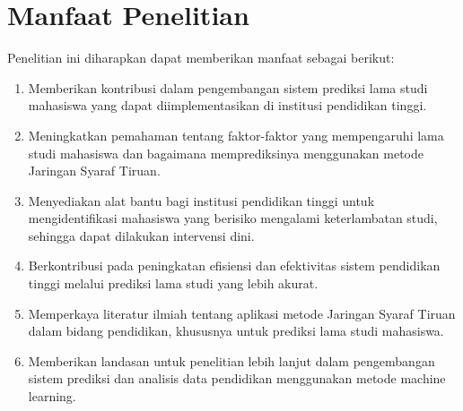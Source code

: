 \section{Manfaat Penelitian}
Penelitian ini diharapkan dapat memberikan manfaat sebagai berikut:

    \begin{enumerate}
        \item Memberikan kontribusi dalam pengembangan sistem prediksi lama studi mahasiswa yang dapat diimplementasikan di institusi pendidikan tinggi.
        \item Meningkatkan pemahaman tentang faktor-faktor yang mempengaruhi lama studi mahasiswa dan bagaimana memprediksinya menggunakan metode Jaringan Syaraf Tiruan.
        \item Menyediakan alat bantu bagi institusi pendidikan tinggi untuk mengidentifikasi mahasiswa yang berisiko mengalami keterlambatan studi, sehingga dapat dilakukan intervensi dini.
        \item Berkontribusi pada peningkatan efisiensi dan efektivitas sistem pendidikan tinggi melalui prediksi lama studi yang lebih akurat.
        \item Memperkaya literatur ilmiah tentang aplikasi metode Jaringan Syaraf Tiruan dalam bidang pendidikan, khususnya untuk prediksi lama studi mahasiswa.
        \item Memberikan landasan untuk penelitian lebih lanjut dalam pengembangan sistem prediksi dan analisis data pendidikan menggunakan metode machine learning.
    \end{enumerate}

